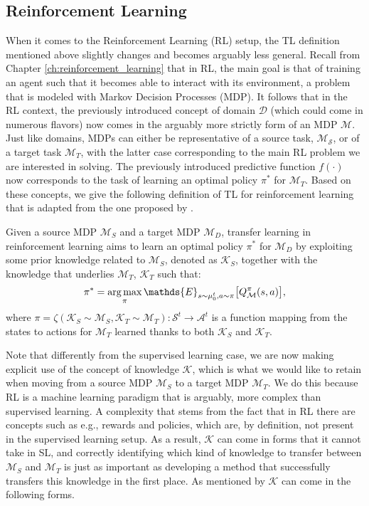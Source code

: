 \subsection{Reinforcement Learning}
\label{sec:reinforcement_learning_tl}
When it comes to the Reinforcement Learning (RL) setup, the TL definition mentioned above slightly changes and becomes arguably less general. Recall from Chapter \ref{ch:reinforcement_learning} that in RL, the main goal is that of training an agent such that it becomes able to interact with its environment, a problem that is modeled with Markov Decision Processes (MDP). It follows that in the RL context, the previously introduced concept of domain $\mathcal{D}$ (which could come in numerous flavors) now comes in the arguably more strictly form of an MDP $\mathcal{M}$. Just like domains, MDPs can either be representative of a source task, $\mathcal{M_S}$, or of a target task $\mathcal{M}_T$, with the latter case corresponding to the main RL problem we are interested in solving. The previously introduced predictive function $f(\cdot)$ now corresponds to the task of learning an optimal policy $\pi^*$ for $\mathcal{M}_T$. Based on these concepts, we give the following definition of TL for reinforcement learning that is adapted from the one proposed by \citet{zhu2020transfer}.

\begin{definition}
	Given a source MDP $\mathcal{M}_S$ and a target MDP $\mathcal{M}_D$, transfer learning in reinforcement learning aims to learn an optimal policy $\pi^{*}$ for $\mathcal{M}_D$ by exploiting some prior knowledge related to $\mathcal{M}_S$, denoted as $\mathcal{K}_S$, together with the knowledge that underlies $\mathcal{M}_T$, $\mathcal{K}_T$ such that:
	\begin{align}
		\pi^{*} = \argmax_{\pi} \mathds{E}_{s \sim\mu_{0}^{t},a\sim\pi}\bigl[Q^{\pi}_\mathcal{M}(s,a)\bigr],
	\end{align}
	where $\pi = \zeta(\mathcal{K}_S \sim \mathcal{M}_S, \mathcal{K}_T \sim \mathcal{M}_T): \mathcal{S}^t \rightarrow \mathcal{A}^t$ is a function mapping from the states to actions for $\mathcal{M}_T$ learned thanks to both $\mathcal{K}_S$ and $\mathcal{K}_T$.
\end{definition}

Note that differently from the supervised learning case, we are now making explicit use of the concept of knowledge $\mathcal{K}$, which is what we would like to retain when moving from a source MDP $\mathcal{M}_S$ to a target MDP $\mathcal{M}_T$. We do this because RL is a machine learning paradigm that is arguably, more complex than supervised learning. A complexity that stems from the fact that in RL there are concepts such as e.g., rewards and policies, which are, by definition, not present in the supervised learning setup. As a result, $\mathcal{K}$ can come in forms that it cannot take in SL, and correctly identifying which kind of knowledge to transfer between $\mathcal{M}_S$ and $\mathcal{M}_T$ is just as important as developing a method that successfully transfers this knowledge in the first place. As mentioned by \citet{lazaric2012transfer} $\mathcal{K}$ can come in the following forms.

